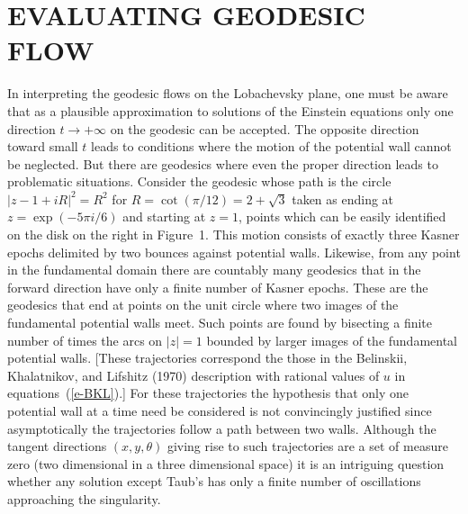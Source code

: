 \section{EVALUATING GEODESIC FLOW}

\indent
In interpreting the geodesic flows on the Lobachevsky plane, one must
be aware that as a plausible approximation to solutions of the
Einstein equations only one direction $t \rightarrow +\infty$ on the
geodesic can be accepted.  The opposite direction toward small $t$
leads to conditions where the motion of the potential wall cannot be
neglected.  But there are geodesics where even the proper
direction leads to problematic situations.  Consider the geodesic
whose path is the circle $|z-1+iR|^2 = R^2$ for $R = \cot(\pi/12) = 2
+ \sqrt{3}$ taken as ending at $z = \exp(-5\pi i/6)$ and starting at
$z=1$, points which can be easily identified on the disk on the right
in Figure~1.  This motion consists of exactly three Kasner epochs
delimited by two bounces against potential walls.  Likewise, from any
point in the fundamental domain there are countably many geodesics
that in the forward direction have only a finite number of Kasner
epochs.  These are the geodesics that end at points on the unit
circle where two images of the fundamental potential walls meet. Such
points are found by bisecting a finite number of times the arcs on
$|z|=1$ bounded by larger images of the fundamental potential walls.
[These trajectories correspond the those in the Belinskii,
Khalatnikov, and Lifshitz (1970) description with rational values of
$u$ in equations~(\ref{e-BKL}).]  For these trajectories the
hypothesis that only one potential wall at a time need be considered
is not convincingly justified since asymptotically the trajectories
follow a path between two walls.  Although the tangent directions
$(x,y,\theta)$ giving rise to such trajectories are a set of measure
zero (two dimensional in a three dimensional space) it is an
intriguing question whether any solution except Taub's has only a
finite number of oscillations approaching the singularity.

